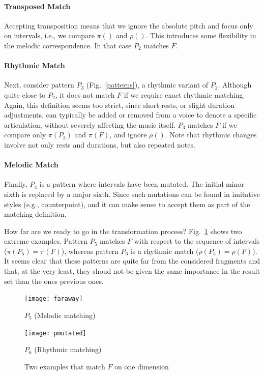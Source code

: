 \documentclass[letterpaper, 11pt]{article}
\begin{document}
\paragraph{Transposed Match}
Accepting transposition means that we ignore the absolute pitch and focus only on
intervals, i.e., we compare  $\pi()$ and $\rho()$. This introduces some flexibility 
in the melodic correspondence. In that case $P_2$ matches $F$. 

\paragraph{Rhythmic Match}
Next, consider pattern $P_3$ (Fig.~\ref{patterns}),  a  rhythmic variant of $P_2$. 
Although quite close to $P_2$, it does not match $F$ 
if we require exact rhythmic matching.
Again, this definition seems too strict, since short rests,
or slight duration adjustments,
can typically be added or removed from a voice to denote a specific articulation,
without severely affecting the music itself.
$P_3$  matches $F$ if we compare only $\pi(P_3)$ and $\pi(F)$, and ignore $\rho()$.
Note that rhythmic changes involve not only rests and durations, but also repeated notes. 

\paragraph{Melodic Match}
Finally, $P_4$ is a pattern where intervals have been mutated. The initial minor sixth
is replaced by a major sixth. Since such mutations can be found in imitative styles
(e.g., counterpoint), and it can make sense to accept them as part of the matching 
definition.

How far are we ready to go in the transformation process? Fig.~\ref{matchex}
shows two extreme examples. Pattern $P_5$ matches $F$ with respect to the sequence of intervals
($\pi(P_5) = \pi(F)$), whereas pattern $P_6$ is a rhythmic match ($\rho(P_5) = \rho(F)$). It seems clear
that these patterns are quite far from the considered fragments and that, at the very least,
they shoud not be given the same importance in the result set than the ones previous ones.

\begin{figure}[th]
\begin{center}
\begin{minipage}[b]{7.5cm}
\texttt{[image: faraway]}
\centerline{$P_5$ (Melodic matching)}
\end{minipage} \hspace*{0.5cm}
\begin{minipage}[b]{7.5cm}
\texttt{[image: pmutated]}
\centerline{$P_6$ (Rhythmic matching)}
\end{minipage}
\end{center}
\caption{\label{matchex} Two examples that match $F$ on one dimension }
\end{figure}
\end{document}
